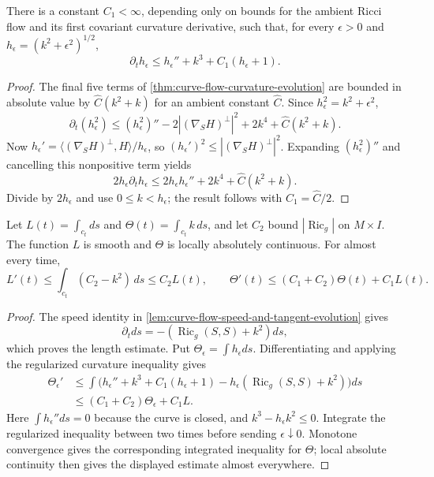 \begin{theorem}
\label{lem:regularized-curve-curvature-inequality}
\notready
There is a constant $C_1<\infty$, depending only on bounds for the ambient
Ricci flow and its first covariant curvature derivative, such that, for every
$\epsilon>0$ and
$h_\epsilon=(k^2+\epsilon^2)^{1/2}$,
\[
 \partial_t h_\epsilon\le h_\epsilon''+k^3+C_1(h_\epsilon+1).
\]
\end{theorem}
\begin{proof}
The final five terms of \ref{thm:curve-flow-curvature-evolution} are bounded in
absolute value by $\widehat C(k^2+k)$ for an ambient constant
$\widehat C$.  Since $h_\epsilon^2=k^2+\epsilon^2$,
\[
 \partial_t(h_\epsilon^2)
 \le (h_\epsilon^2)''-2|(\nabla_SH)^\perp|^2
       +2k^4+\widehat C(k^2+k).
\]
Now
$h_\epsilon'=\langle(\nabla_SH)^\perp,H\rangle/h_\epsilon$, so
$(h_\epsilon')^2\le |(\nabla_SH)^\perp|^2$.  Expanding
$(h_\epsilon^2)''$ and cancelling this nonpositive term yields
\[
 2h_\epsilon\partial_t h_\epsilon
 \le2h_\epsilon h_\epsilon''+2k^4+\widehat C(k^2+k).
\]
Divide by $2h_\epsilon$ and use $0\le k<h_\epsilon$; the result follows
with $C_1=\widehat C/2$.
\end{proof}

\begin{theorem}
\label{lem:curve-flow-length-total-curvature-evolution}
\notready
Let
$L(t)=\int_{c_t}ds$ and $\Theta(t)=\int_{c_t}k\,ds$, and let $C_2$ bound
$|\operatorname{Ric}_g|$ on $M\times I$.  The function $L$ is smooth and
$\Theta$ is locally absolutely continuous.  For almost every time,
\[
 L'(t)\le\int_{c_t}(C_2-k^2)\,ds\le C_2L(t),
 \qquad
 \Theta'(t)\le(C_1+C_2)\Theta(t)+C_1L(t).
\]
\end{theorem}
\begin{proof}
The speed identity in \ref{lem:curve-flow-speed-and-tangent-evolution} gives
\[
 \partial_tds=-(\operatorname{Ric}_g(S,S)+k^2)ds,
\]
which proves the length estimate.  Put
$\Theta_\epsilon=\int h_\epsilon ds$.  Differentiating and applying the
regularized curvature inequality gives
\begin{align*}
 \Theta_\epsilon'
 &\le\int\bigl(h_\epsilon''+k^3+C_1(h_\epsilon+1)
 -h_\epsilon(\operatorname{Ric}_g(S,S)+k^2)\bigr)ds\\
 &\le(C_1+C_2)\Theta_\epsilon+C_1L.
\end{align*}
Here $\int h_\epsilon''ds=0$ because the curve is closed, and
$k^3-h_\epsilon k^2\le0$.  Integrate the regularized inequality between two
times before sending $\epsilon\downarrow0$.  Monotone convergence gives the
corresponding integrated inequality for $\Theta$; local absolute continuity
then gives the displayed estimate almost everywhere.
\end{proof}

